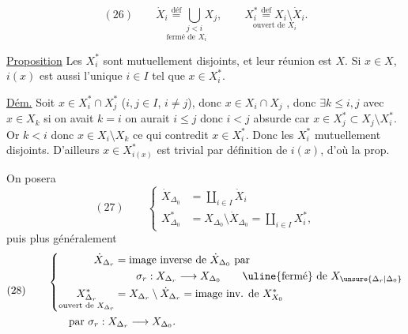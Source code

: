 \[
(26)\qquad
\underset{\text{fermé de }X_i}{\dot X_i\overset{\text{déf}}=\bigcup_{j<i}X_j},
\qquad
\underset{\text{ouvert de }X_i}{X_i^*\overset{\mathrm{def}}=X_i\setminus\dot X_i}.
\]


\uline{Proposition} Les $X_i^*$ sont mutuellement disjoints, et leur réunion est $X$. Si $x\in X$, $i(x)$ est aussi l'unique $i\in I$ tel que $x\in X_i^*$.

\uline{Dém.} Soit $x\in X_i^*\cap X_j^*$ ($i,j\in I$, $i\ne j$), donc  $x\in X_i\cap X_j$ , donc $\exists k\leq i,j$ avec
$x\in X_k$ si on avait $k=i$ on aurait $i\leq j$ donc $i<j$ absurde car $x\in X_j^*\subset X_j\setminus X_i^*$.
Or $k<i$ donc $x\in X_i\setminus X_k$ ce qui contredit $x\in X_i^*$. Donc les $X_i^*$ mutuellement disjoints. D'ailleurs $x\in X_{i(x)}^*$ est trivial par définition de $i(x)$, d'où la prop.

On posera
\[
(27)\qquad
\left\{\begin{aligned}
\dot X_{\Delta_0}&=\coprod_{i\in I}\dot X_i\\
X_{\Delta_0}^*&=X_{\Delta_0}\setminus\dot X_{\Delta_0}=\coprod_{i\in I}X_i^*,
\end{aligned}\right.
\]
puis  plus généralement
\[
(28)\qquad
\begin{aligned}
&\left\{\begin{aligned}
\dot X_{\Delta_r}&=\text{image inverse de }\dot X_{\Delta_0}\text{ par}\\
&\qquad\sigma_r:X_{\Delta_r}\longrightarrow X_{\Delta_0}
\qquad\text{\uline{fermé} de }X_{\unsure{\Delta_r|\Delta_0}}\\
\underset{\text{ouvert de }X_{\Delta_r}}{X_{\Delta_r}^*}&=X_{\Delta_r}\setminus\dot X_{\Delta_r}=\text{image inv. de }X_{X_0}^*
\end{aligned}\right.\\
&\qquad\text{par }\sigma_r:X_{\Delta_r}\longrightarrow X_{\Delta_0}.
\end{aligned}
\]
